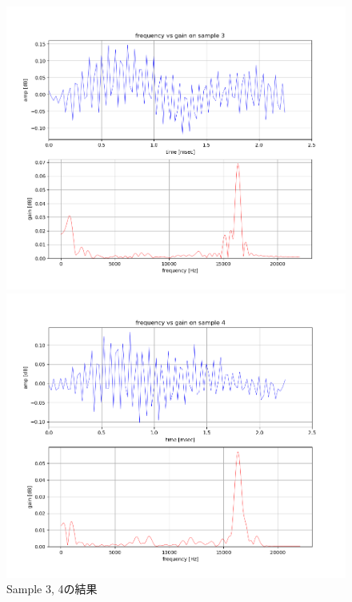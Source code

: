 \documentclass[dvipdfmx,titlepage,a4j]{jsarticle}  %
\begin{document}
\begin{figure}[H]
  \begin{minipage}[b]{0.45\linewidth}
    \centering
    \includegraphics[scale=0.3]{../picture/3.png}
  \end{minipage}
  \begin{minipage}[b]{0.45\linewidth}
    \centering
    \includegraphics[scale=0.3]{../picture/4.png}
  \end{minipage}
  \caption{Sample 3, 4の結果}
  \label{fig:sample2}
\end{figure}
\end{document}
